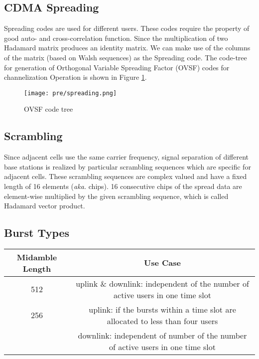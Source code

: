 \subsection{CDMA Spreading}
Spreading codes are used for different users. These codes require the property of good auto- and cross-correlation function. Since the multiplication of two Hadamard matrix produces an identity matrix. We can make use of the columns of the matrix (based on Walsh sequences) as the Spreading code. The code-tree for generation of Orthogonal Variable Spreading Factor (OVSF) codes for channelization Operation is shown in Figure \ref{fig:pre:spreading}.

\begin{figure}
	\begin{center}
		\texttt{[image: pre/spreading.png]}
		\caption{OVSF code tree \citealp{e1}}
		\label{fig:pre:spreading}
	\end{center}
\end{figure}

\subsection{Scrambling}
Since adjacent cells use the same carrier frequency, signal separation of different base stations is realized by particular scrambling sequences which are specific for adjacent cells. These scrambling sequences are complex valued and have a fixed length of 16 elements (\emph{aka.} chips). 16 consecutive chips of the spread data are element-wise multiplied by the given scrambling sequence, which is called Hadamard vector product.

\subsection{Burst Types}
\begin{table}[H]
\centering
\begin{tabular}{|c|c|}
	\hline
	Midamble Length & Use Case \\ \hline
	512 & uplink \& downlink: independent of the number of active users in one time slot \\ \hline
	256 & uplink: if the bursts within a time slot are allocated to less than four users\\ 
	& downlink: independent of number of the number of active users in one time slot\\
	\hline	
\end{tabular}
\end{table}

